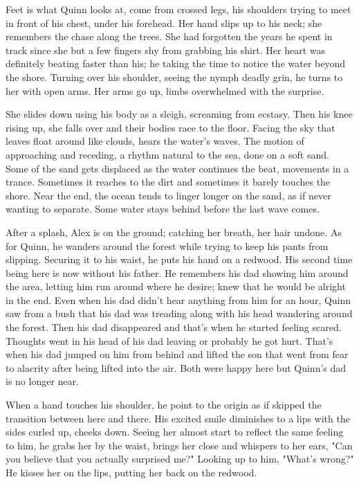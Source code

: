 \begin{Document}
            Feet is what Quinn looks at, come from crossed legs, his shoulders trying to meet in front of his chest, under his forehead. Her hand slips up to
        his neck; she remembers the chase along the trees. She had forgotten the years he spent in track since she but a few fingers shy from grabbing his shirt.
        Her heart was definitely beating faster than his; he taking the time to notice the water beyond the shore. Turning over his shoulder, seeing the nymph
        deadly grin, he turns to her with open arms. Her arms go up, limbs overwhelmed with the surprise.

            She slides down using his body as a sleigh, screaming from ecstasy. Then his knee rising up, she falls over and their bodies race to the floor. Facing
        the sky that leaves float around like clouds, hears the water's waves. The motion of approaching and receding, a rhythm natural to the sea, done on
        a soft sand. Some of the sand gets displaced as the water continues the beat, movements in a trance. Sometimes it reaches to the dirt and sometimes it
        barely touches the shore. Near the end, the ocean tends to linger longer on the sand, as if never wanting to separate. Some water stays behind before
        the last wave comes.

            After a splash, Alex is on the ground; catching her breath, her hair undone. As for Quinn, he wanders around the forest while trying to keep his pants from slipping.
        Securing it to his waist, he puts his hand on a redwood. His second time being here is now without his father. He remembers his dad showing him around
        the area, letting him run around where he desire; knew that he would be alright in the end. Even when his dad didn't hear anything from him for an hour,
        Quinn saw from a bush that his dad was treading along with his head wandering around the forest. Then his dad disappeared and that's when he started
        feeling scared. Thoughts went in his head of his dad leaving or probably he got hurt. That's when his dad jumped on him from behind and lifted the son
        that went from fear to alacrity after being lifted into the air. Both were happy here but Quinn's dad is no longer near.

            When a hand touches his shoulder, he point to the origin as if skipped the transition between here and there. His excited smile diminishes to a lips
        with the sides curled up, cheeks down. Seeing her almost start to reflect the same feeling to him, he grabs her by the waist, brings her close and 
        whispers to her ears, "Can you believe that you actually surprised me?" Looking up to him, "What's wrong?" He kisses her on the lips, putting her back
        on the redwood.


\end{Document}
